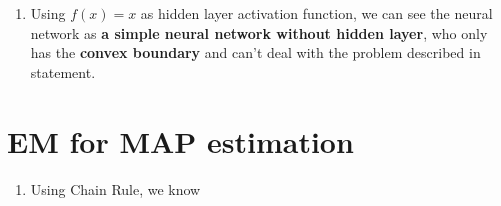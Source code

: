 \documentclass[12pt]{article}
\begin{document}
\begin{enumerate}[label=(\alph*)]
$$\begin{matrix}
            1 \\
            h_1 \\
            h_2\\
            h_3\\
        \end{matrix}\right]
        $$
        Once the point is in the triangle, the first product will be 
        $$
        \left[\begin{matrix}
            1 \\
            1 \\
            1 \\
        \end{matrix}\right]
        $$ 
        So the second product will be -0.67 and the final result will be 0.
        Otherwise, the second product will be larger or equal to 0.33 and the final result will be 1.
        \item Using $f(x)=x$ as hidden layer activation function, we can see the neural network as \textbf{a simple neural network without hidden layer},
        who only has the \textbf{convex boundary} and can't deal with the problem described in statement.
    \end{enumerate}

    \section*{EM for MAP estimation}
    \begin{enumerate}[label=(\alph*)]
        \item Using Chain Rule, we know
    \end{enumerate}
\end{document}
